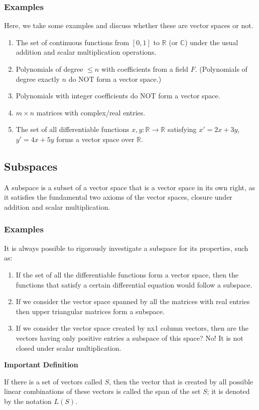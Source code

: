 \subsubsection{Examples}
Here, we take some examples and discuss whether these are vector spaces or not. 

\begin{enumerate}
    \item The set of continuous functions from $[0, 1]$ to $\mathbb{R}$ (or $\mathbb{C}$) under the usual addition and scalar multiplication operations.
    \item Polynomials of degree $\leq n$ with coefficients from a field $F$. (Polynomials of degree exactly $n$ do NOT form a vector space.)
    \item Polynomials with integer coefficients do NOT form a vector space.
    \item $m \times n$ matrices with complex/real entries.
    \item The set of all differentiable functions $x, y : \mathbb{R} \to \mathbb{R}$ satisfying $x' = 2x + 3y$, $y' = 4x + 5y$ forms a vector space over $\mathbb{R}$.
\end{enumerate}

\subsection{Subspaces}
A subspace is a subset of a vector space that is a vector space in its own right, as it satisfies the fundamental two axioms of the vector spaces, closure under addition and scalar multiplication. 


\subsubsection{Examples}
It is always possible to rigorously investigate a subspace for its properties, such as:

\begin{enumerate}
    \item If the set of all the differentiable functions form a vector space, then the functions that satisfy a certain differential equation would follow a subspace. 
    \item If we consider the vector space spanned by all the matrices with real entries then upper triangular matrices form a subspace. 
    \item If we consider the vector space created by nx1 column vectors, then are the vectors having only positive entries a subspace of this space? No! It is not closed under scalar multiplication. 
\end{enumerate}

\textbf{Important Definition}

\begin{outline}
    If there is a set of vectors called $S$, then the vector that is created by all possible linear combinations of these vectors is called the span of the set $S$; it is denoted by the notation $L(S)$.
\end{outline}